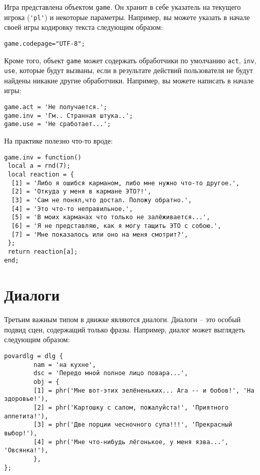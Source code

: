 \documentclass[a4paper,12pt]{article}
\begin{document}
Игра представлена объектом \verb/game/. Он хранит в себе указатель на текущего игрока (\verb/'pl'/) и некоторые параметры. Например, вы можете указать в начале своей игры кодировку текста следующим образом:

\begin{verbatim}
game.codepage="UTF-8";
\end{verbatim}

Кроме того, объект \verb/game/ может содержать обработчики по умолчанию \verb/act/, \verb/inv/, \verb/use/, которые будут вызваны, если в результате действий пользователя не будут найдены никакие другие обработчики. Например, вы можете написать в начале игры:

\begin{verbatim}
game.act = 'Не получается.';
game.inv = 'Гм.. Странная штука..';
game.use = 'Не сработает...';
\end{verbatim}

На практике полезно что-то вроде:

\begin{verbatim}
game.inv = function()
 local a = rnd(7);
 local reaction = {
  [1] = 'Либо я ошибся карманом, либо мне нужно что-то другое.',
  [2] = 'Откуда у меня в кармане ЭТО?!',
  [3] = 'Сам не понял,что достал. Положу обратно.',
  [4] = 'Это что-то неправильное.',
  [5] = 'В моих карманах что только не залёживается...',
  [6] = 'Я не представляю, как я могу тащить ЭТО с собою.',
  [7] = 'Мне показалось или оно на меня смотрит?',
 };
 return reaction[a];
end;
\end{verbatim}

\section{Диалоги}

Третьим важным типом в движке являются диалоги. Диалоги -- это особый подвид сцен, содержащий только фразы. Например, диалог может выглядеть следующим образом:

\begin{verbatim}
povardlg = dlg {
        nam = 'на кухне',
        dsc = 'Передо мной полное лицо повара...',
        obj = {
        [1] = phr('Мне вот-этих зелёненьких... Ага -- и бобов!', 'На здоровье!'),
        [2] = phr('Картошку с салом, пожалуйста!', 'Приятного аппетита!'),
        [3] = phr('Две порции чесночного супа!!!', 'Прекрасный выбор!'),
        [4] = phr('Мне что-нибудь лёгонькое, у меня язва...', 'Овсянка!'),
        },
};
\end{verbatim}
\end{document}
